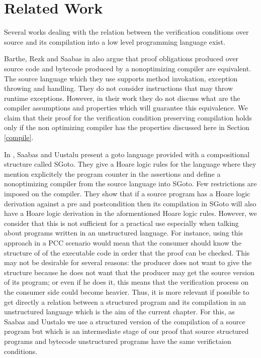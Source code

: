 \section{Related Work}\label{pog:relWork}


Several works dealing with the relation between the 
verification conditions over source and its compilation into a low  level  programming  language exist.

Barthe, Rezk and Saabas in \cite{gta05:fast} also argue that proof obligations produced
over source code and
bytecode produced by a nonoptimizing compiler   are equivalent.
The source language which they use supports method invokation, exception throwing and handling. 
They do not consider instructions that may throw
runtime exceptions. 
 However, in their work they do not discuss  what are the compiler assumptions
and properties  which will guarantee this equivalence. We claim that their proof for
 the verification condition preserving compilation holds only if the non optimizing 
 compiler has the properties discussed here in Section \ref{compile}.


In \cite{SU05CNS}, Saabas and Uustalu present a goto language provided with a compositional structure called SGoto.
They give a Hoare logic rules for the language where they mention explicitely the program counter in the assertions and define a nonoptimizing 
compiler from the source language into SGoto. Few  restrictions are imposed on the compiler. 
They show that if a source program has a Hoare logic derivation
 against a pre and postcondition then its compilation in SGoto will also have a Hoare
 logic derivation in the aformentioned Hoare logic rules. However, we consider that this is not sufficient for a practical use especially when 
talking about programs written in an unstructured language. 
For instance, using this approach in a PCC scenario would mean that the consumer should know the structure of 
of the  executable code in order that the proof can be checked. This may not be desirable for several reasons:
the producer does not want to  give the structure because he does not want that the producer may get the source version of its program; 
or even if he does it, this means that the verification process on the consumer side could become heavier.
 Thus, it is more relevant if possible to get directly  a relation between a structured program 
and its compilation in an  unstructured  language which is the aim of the current chapter.
 For this, as Saabas and Uustalo we use a  structured version of the compilation of a source program 
but which is an intermediate stage of our proof that source structured programs and bytecode unstructured 
programs have the same verifictaion conditions.

